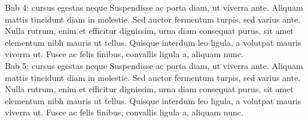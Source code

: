 Bab 4: cursus egestas neque
Suspendisse ac porta diam, ut viverra ante. Aliquam mattis tincidunt diam in molestie. Sed auctor fermentum turpis, sed varius ante. Nulla rutrum, enim et efficitur dignissim, urna diam consequat purus, sit amet elementum nibh mauris ut tellus. Quisque interdum leo ligula, a volutpat mauris viverra ut. Fusce ac felis finibus, convallis ligula a, aliquam nunc.\\

Bab 5: cursus egestas neque
Suspendisse ac porta diam, ut viverra ante. Aliquam mattis tincidunt diam in molestie. Sed auctor fermentum turpis, sed varius ante. Nulla rutrum, enim et efficitur dignissim, urna diam consequat purus, sit amet elementum nibh mauris ut tellus. Quisque interdum leo ligula, a volutpat mauris viverra ut. Fusce ac felis finibus, convallis ligula a, aliquam nunc.\\
